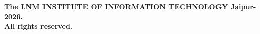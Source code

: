 \thispagestyle{empty}
\vfill
\begin{center}
\vspace*{\fill} \textcopyright \textbf{The LNM INSTITUTE OF INFORMATION TECHNOLOGY Jaipur-2026.}\\
\textbf{All rights reserved.}
\end{center}
\clearpage
